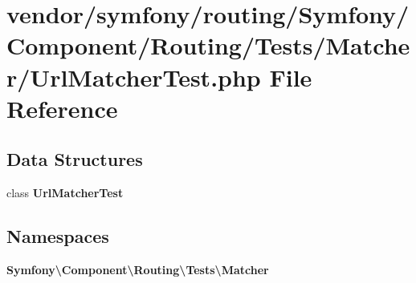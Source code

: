 \section{vendor/symfony/routing/\+Symfony/\+Component/\+Routing/\+Tests/\+Matcher/\+Url\+Matcher\+Test.php File Reference}
\label{_url_matcher_test_8php}
\subsection*{Data Structures}
\begin{DoxyCompactItemize}
\item 
class {\bf Url\+Matcher\+Test}
\end{DoxyCompactItemize}
\subsection*{Namespaces}
\begin{DoxyCompactItemize}
\item 
 {\bf Symfony\textbackslash{}\+Component\textbackslash{}\+Routing\textbackslash{}\+Tests\textbackslash{}\+Matcher}
\end{DoxyCompactItemize}
